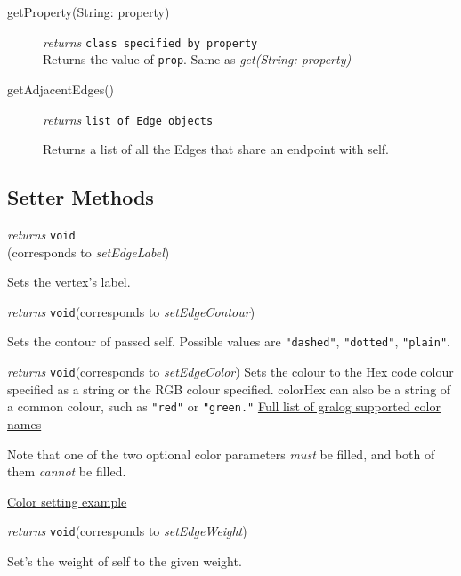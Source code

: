 \documentclass{article}
\newcounter{example}
\newlength\q
\begin{document}
\begin{description}
\item[getProperty(String: property)] \emph{returns} \texttt{class specified by property}\\
Returns the value of \texttt{prop}. 
Same as \textit{get(String: property)}

\item[getAdjacentEdges()]\emph{returns}
  \texttt{list of Edge objects}

Returns a list of all the Edges that share an endpoint with self.

\end{description}
\subsection{Setter Methods}
\begin{description}
\label{setEdgeLabelClass}\item[setLabel(String: label)]\emph{returns} \texttt{void}\\\quad(corresponds to \textit{setEdgeLabel})

Sets the vertex's label.

\label{setEdgeContourClass}\item[setContour(str: contour)] \emph{returns} \texttt{void}\quad(corresponds to \textit{setEdgeContour})

Sets the contour of passed self. Possible values are
\texttt{"dashed"}, \texttt{"dotted"}, \texttt{"plain"}.

\label{setEdgeColorClass}\item[setColor({[string: colorHex]},{[(int,int,int): colorRGB]})]\emph{returns} \texttt{void}\quad(corresponds to \textit{setEdgeColor})
Sets the colour to the Hex code colour
specified as a string or the RGB colour specified. colorHex can also be
a string of a common colour, such as \texttt{"red"} or
\texttt{"green."} \hyperref[colorNamesSupportedByGralog]{Full list of gralog supported color names}

Note that one of the two optional color parameters \textit{must} be filled, and both of them \textit{cannot} be filled.

\hyperref[colorNamesSupportedByGralog]{Color setting example}

\label{setEdgeWeightClass}\item[setWeight({float: weight})]\emph{returns} \texttt{void}\quad(corresponds to \textit{setEdgeWeight})

Set's the weight of self to the given weight.


\end{description}
\end{document}
